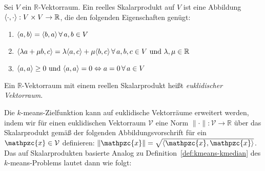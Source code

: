 \begin{definition}
\label{def:innerproductspace}
	Sei $V$ ein $\mathbb{R}$-Vektorraum. Ein reelles Skalarprodukt auf $V$ ist eine Abbildung
	$\langle \cdot, \cdot \rangle : V \times V \rightarrow \mathbb{R}$, die den folgenden Eigenschaften genügt:
	\begin{enumerate}
		\item 	$\langle a, b \rangle = \langle b, a \rangle \, \forall \, a, b \in V$
		\item 	$\langle \lambda a + \mu b, c \rangle = \lambda \langle a, c \rangle + \mu \langle b, c \rangle \,
				\forall \, a,b,c \in V \textrm{ und } \lambda, \mu \in \mathbb{R}$
		\item 	$\langle a, a \rangle \geq 0 \textrm{ und } \langle a, a \rangle = 0 \Leftrightarrow a = 0 \, \forall \, a \in V$
	\end{enumerate}
	Ein $\mathbb{R}$-Vektorraum mit einem reellen Skalarprodukt heißt \emph{euklidischer Vektorraum}.
\end{definition}
Die $k$-means-Zielfunktion kann auf euklidische Vektorräume erweitert werden, indem wir für einen euklidischen Vektorraum
$\mathcal{V}$ eine Norm $\lVert \cdot \rVert : \mathcal{V} \rightarrow \mathbb{R}$ über das Skalarprodukt gemäß der folgenden
Abbildungsvorschrift für ein $\mathpzc{x} \in \mathcal{V}$ definieren:
$\lVert \mathpzc{x} \rVert = \sqrt{\innerproduct{\mathpzc{x}}{\mathpzc{x}}}$.
Das auf Skalarprodukten basierte Analog zu Definition~\ref{def:kmeans-kmedian} des $k$-means-Problems lautet dann wie folgt:

